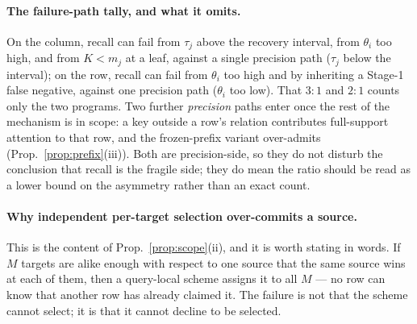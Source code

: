\documentclass{article}
\begin{document}
\paragraph{The failure-path tally, and what it omits.} On the column, recall can fail from
$\tau_j$ above the recovery interval, from $\theta_i$ too high, and from $K<m_j$ at a leaf,
against a single precision path ($\tau_j$ below the interval); on the row, recall can fail from
$\theta_i$ too high and by inheriting a Stage-1 false negative, against one precision path
($\theta_i$ too low). That $3\!:\!1$ and $2\!:\!1$ counts only the two programs. Two further
\emph{precision} paths enter once the rest of the mechanism is in scope: a key outside a
row's relation contributes full-support attention to that row, and the frozen-prefix variant over-admits
(Prop.~\ref{prop:prefix}(iii)). Both are precision-side, so they do not disturb the conclusion
that recall is the fragile side; they do mean the ratio should be read as a lower bound on the
asymmetry rather than an exact count.

\paragraph{Why independent per-target selection over-commits a source.} This is the content of
Prop.~\ref{prop:scope}(ii), and it is worth stating in words. If $M$ targets are alike enough
with respect to one source that the same source wins at each of them, then a query-local scheme
assigns it to all $M$ --- no row can know that another row has already claimed it. The failure
is not that the scheme cannot select; it is that it cannot decline to be selected.
\end{document}
